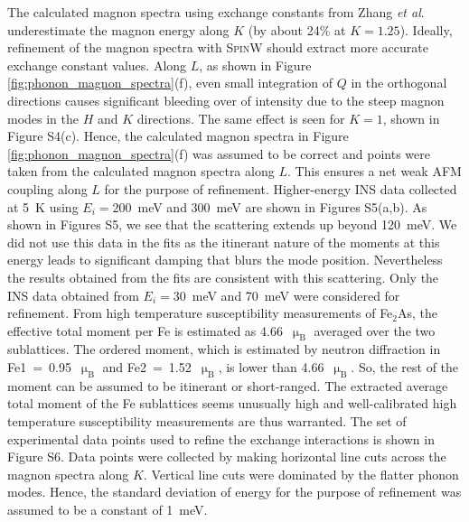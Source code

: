 \documentclass[10pt,doublespacing,edeposit]{uiucthesis2020}
\begin{document}
\begin{mainmatter}
The calculated magnon spectra using exchange constants from Zhang \emph{et al}.\cite{Zhang2013} underestimate the magnon energy along $K$ (by about 24\% at $K = 1.25$).
Ideally, refinement of the magnon spectra with \textsc{SpinW}\cite{Toth_2015} should extract more accurate exchange constant values.
Along $L$, as shown in Figure \ref{fig:phonon_magnon_spectra}(f), even small integration of $Q$ in the orthogonal directions causes significant bleeding over of intensity due to the steep magnon modes in the $H$ and $K$ directions. The same effect is seen for $K = 1$, shown in Figure S4(c).\cite{supplement} 
Hence, the calculated magnon spectra in Figure \ref{fig:phonon_magnon_spectra}(f) was assumed to be correct and points were taken from the calculated magnon spectra along $L$. This ensures a net weak AFM coupling along $L$ for the purpose of refinement.
Higher-energy INS data collected at 5~K using $E_i=200$~meV and 300~meV are shown in Figures S5(a,b).\cite{supplement} As shown in Figures S5, we see that the scattering extends up beyond 120~meV. We did not use this data in the fits as the itinerant nature of the moments at this energy leads to significant damping that blurs the mode position.  Nevertheless the results obtained from the fits are consistent with this scattering. Only the INS data obtained from $E_i=30$~meV and 70~meV  were considered for refinement.
From high temperature susceptibility measurements of Fe$_2$As,\cite{Katsuraki1966} the effective total moment per Fe is estimated as 4.66~$\upmu_\text{B}$ averaged over the two sublattices. The ordered moment, which is estimated by neutron diffraction in Fe1~=~0.95~$\upmu_\text{B}$ and Fe2~=~1.52~$\upmu_\text{B}$, is lower than 4.66~$\upmu_\text{B}$.\cite{Katsuraki1966,Zhang2013} So, the rest of the moment can be assumed to be itinerant or short-ranged. The extracted average total moment of the Fe sublattices seems unusually high and well-calibrated high temperature susceptibility measurements are thus warranted.
The set of experimental data points used to refine the exchange interactions is shown in Figure S6.\cite{supplement} Data points were collected by making horizontal line cuts across the magnon spectra along $K$. Vertical line cuts were dominated by the flatter phonon modes. Hence, the standard deviation of energy for the purpose of refinement was assumed to be a constant of 1~meV.



\end{mainmatter}
\end{document}
